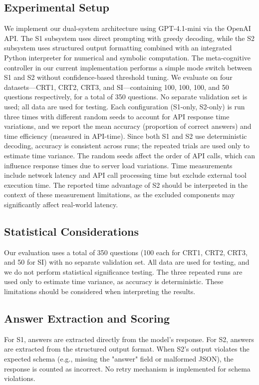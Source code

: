 \documentclass[11pt]{article}
\begin{document}
\subsection{Experimental Setup}
We implement our dual-system architecture using GPT-4.1-mini via the OpenAI API.
The S1 subsystem uses direct prompting with greedy decoding, while the S2 subsystem uses structured output formatting combined with an integrated Python interpreter for numerical and symbolic computation. 
The meta-cognitive controller in our current implementation performs a simple mode switch between S1 and S2 without confidence-based threshold tuning. 
We evaluate on four datasets—CRT1, CRT2, CRT3, and SI—containing 100, 100, 100, and 50 questions respectively, for a total of 350 questions. 
No separate validation set is used; all data are used for testing. 
Each configuration (S1-only, S2-only) is run three times with different random seeds to account for API response time variations, and we report the mean accuracy (proportion of correct answers) and time efficiency (measured in API-time). 
Since both S1 and S2 use deterministic decoding, accuracy is consistent across runs; the repeated trials are used only to estimate time variance.
The random seeds affect the order of API calls, which can influence response times due to server load variations.
Time measurements include network latency and API call processing time but exclude external tool execution time. The reported time advantage of S2 should be interpreted in the context of these measurement limitations, as the excluded components may significantly affect real-world latency.

\subsection{Statistical Considerations}
Our evaluation uses a total of 350 questions (100 each for CRT1, CRT2, CRT3, and 50 for SI) with no separate validation set. All data are used for testing, and we do not perform statistical significance testing. The three repeated runs are used only to estimate time variance, as accuracy is deterministic. These limitations should be considered when interpreting the results.

\subsection{Answer Extraction and Scoring}
For S1, answers are extracted directly from the model's response. For S2, answers are extracted from the structured output format. When S2's output violates the expected schema (e.g., missing the "answer" field or malformed JSON), the response is counted as incorrect. No retry mechanism is implemented for schema violations. 
\end{document}
